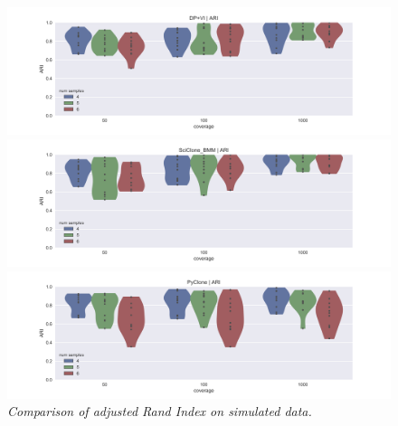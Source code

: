 \documentclass[11pt]{article}
\begin{document}
\newpage
\begin{figure}[H]
\vspace{-0.25in}
\centerline{\includegraphics[scale=0.75]{DPVI_ARI.png}}
\centerline{\includegraphics[scale=0.75]{SciClone_ARI.png}}
\centerline{\includegraphics[scale=0.75]{PyClone_ARI.png}}
\caption{\emph{Comparison of adjusted Rand Index on simulated data.}}
\label{fig:SimARI}
\end{figure}
\end{document}

